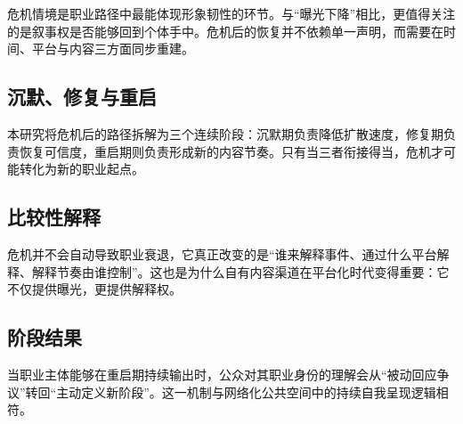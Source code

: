 危机情境是职业路径中最能体现形象韧性的环节。与“曝光下降”相比，更值得关注的是叙事权是否能够回到个体手中。危机后的恢复并不依赖单一声明，而需要在时间、平台与内容三方面同步重建。

\subsection{沉默、修复与重启}

本研究将危机后的路径拆解为三个连续阶段：沉默期负责降低扩散速度，修复期负责恢复可信度，重启期则负责形成新的内容节奏。只有当三者衔接得当，危机才可能转化为新的职业起点。

\subsection{比较性解释}

危机并不会自动导致职业衰退，它真正改变的是“谁来解释事件、通过什么平台解释、解释节奏由谁控制”。这也是为什么自有内容渠道在平台化时代变得重要：它不仅提供曝光，更提供解释权。

\subsection{阶段结果}

当职业主体能够在重启期持续输出时，公众对其职业身份的理解会从“被动回应争议”转回“主动定义新阶段”。这一机制与网络化公共空间中的持续自我呈现逻辑相符\cite{boyd2010,Goffman1959}。
